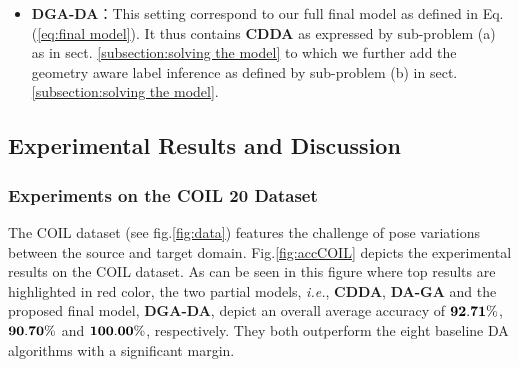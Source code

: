 \documentclass[journal,twocolumn]{IEEEtran}
\begin{document}
\begin{CJK*}{UTF8}{gkai}
\begin{itemize}
\item \textbf{DGA-DA}：This setting correspond to our full final model as defined in Eq.(\ref{eq:final model}). It thus contains \textbf{ CDDA} as expressed by  sub-problem (a) as in sect. \ref{subsection:solving the model} to which we further add the geometry aware label inference as defined by  sub-problem (b) in sect. \ref{subsection:solving the model}. 
\end{itemize}
    
    
    
\subsection{Experimental Results and Discussion}
\label{subsection: Experimental Results and Discussion}





\subsubsection{\textbf{Experiments on the COIL 20 Dataset}} 
\label{subsubsection: results on the COIL dataset}
The COIL dataset (see fig.\ref{fig:data}) features the challenge of pose variations between the source and target domain. Fig.\ref{fig:accCOIL} depicts the experimental results on the COIL dataset.  As can be seen in this figure where top results are highlighted in red color, the two partial models, \textit{i.e.},  \textbf{CDDA}, \textbf{DA-GA} and the proposed final model, \textbf{DGA-DA}, depict an overall average accuracy of  $\bf 92.71\%$, $\bf 90.70\%$ and $\bf 100.00\%$, respectively. They both outperform the eight baseline DA algorithms with a significant margin.


\end{CJK*}
\end{document}
